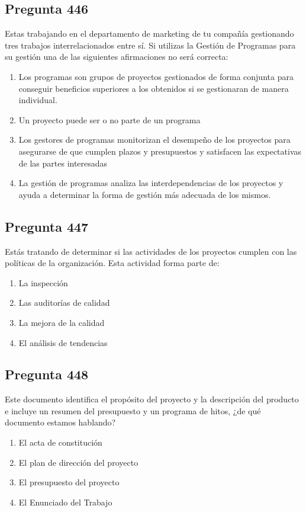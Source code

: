 \documentclass[11pt,a4paper]{article}
\begin{document}
\subsection*{Pregunta 446}
Estas trabajando en el departamento de marketing de tu compañía gestionando tres trabajos interrelacionados entre sí. Si utilizas la Gestión de Programas para su gestión una de las siguientes afirmaciones no será correcta:

\begin{enumerate}[label=\alph*)]
  \item Los programas son grupos de proyectos gestionados de forma conjunta para conseguir beneficios superiores a los obtenidos si se gestionaran de manera individual.
  \item Un proyecto puede ser o no parte de un programa
  \item Los gestores de programas monitorizan el desempeño de los proyectos para asegurarse de que cumplen plazos y presupuestos y satisfacen las expectativas de las partes interesadas
  \item La gestión de programas analiza las interdependencias de los proyectos y ayuda a determinar la forma de gestión más adecuada de los mismos.
\end{enumerate}

\subsection*{Pregunta 447}
Estás tratando de determinar si las actividades de los proyectos cumplen con las políticas de la organización. Esta actividad forma parte de:

\begin{enumerate}[label=\alph*)]
  \item La inspección
  \item Las auditorías de calidad
  \item La mejora de la calidad
  \item El análisis de tendencias
\end{enumerate}

\subsection*{Pregunta 448}
Este documento identifica el propósito del proyecto y la descripción del producto e incluye un resumen del presupuesto y un programa de hitos, ¿de qué documento estamos hablando?

\begin{enumerate}[label=\alph*)]
  \item El acta de constitución
  \item El plan de dirección del proyecto
  \item El presupuesto del proyecto
  \item El Enunciado del Trabajo
\end{enumerate}
\end{document}

